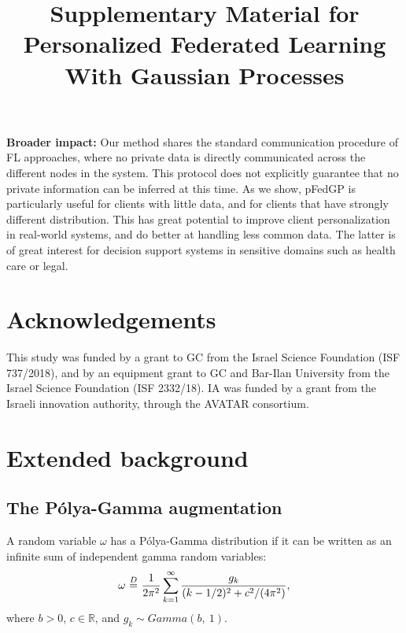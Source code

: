 \documentclass{article}
\def\sR{{\mathbb{R}}}
\newcommand{\pg}{P\'olya-Gamma }
\begin{document}
\textbf{Broader impact:} Our method shares the standard communication procedure of FL approaches, where no private data is directly communicated across the different nodes in the system. This protocol does not explicitly guarantee that no private information can be inferred at this time. As we show, pFedGP is particularly useful for clients with little data, and for clients that have strongly different distribution. This has great potential to improve client personalization in real-world systems, and do better at handling less common data. The latter is of great interest for decision support systems in sensitive domains such as health care or legal.


\section*{Acknowledgements} 
This study was funded by a grant to GC from the Israel Science Foundation (ISF 737/2018), and by an equipment grant to GC and Bar-Ilan University from the Israel Science Foundation (ISF 2332/18). IA  was funded by a grant from the Israeli innovation authority, through the AVATAR consortium.






\clearpage

\title{Supplementary Material for Personalized Federated Learning With Gaussian Processes}

\maketitle
\appendix

\section{Extended background}
\subsection{The \pg augmentation} \label{sec_app:pg_back}
A random variable $\omega$ has a \pg distribution if it can be written as an infinite sum of independent gamma random variables:
\begin{equation} \label{eq:pg_rv}
    \begin{aligned}
    \omega~{\buildrel D \over =}~\frac{1}{2\pi^2}\sum_{k=1}^{\infty} \frac{g_k}{(k - 1/2)^2 + c^2/(4\pi^2)},\\
    \end{aligned}
\end{equation}
where $b >0$, $c \in \sR$, and $g_k \sim Gamma(b,~1)$. 
\end{document}
